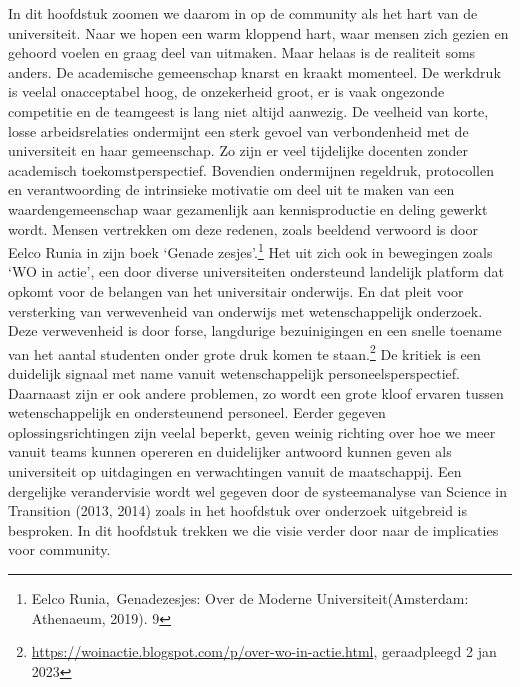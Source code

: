 \documentclass{jote-book}
\begin{document}
	In dit hoofdstuk zoomen we daarom in op de community als het hart van de universiteit. Naar we hopen een warm kloppend hart, waar mensen zich gezien en gehoord voelen en graag deel van uitmaken. Maar helaas is de realiteit soms anders. De academische gemeenschap knarst en kraakt momenteel. De werkdruk is veelal onacceptabel hoog, de onzekerheid groot, er is vaak ongezonde competitie en de teamgeest is lang niet altijd aanwezig. De veelheid van korte, losse arbeidsrelaties ondermijnt een sterk gevoel van verbondenheid met de universiteit en haar gemeenschap. Zo zijn er veel tijdelijke docenten zonder academisch toekomstperspectief. Bovendien ondermijnen regeldruk, protocollen en verantwoording de intrinsieke motivatie om deel uit te maken van een waardengemeenschap waar gezamenlijk aan kennisproductie en deling gewerkt wordt. Mensen vertrekken om deze redenen, zoals beeldend verwoord is door Eelco Runia in zijn boek ‘Genade zesjes'.\footnote{Eelco Runia, Genadezesjes: Over de Moderne Universiteit(Amsterdam: Athenaeum, 2019). 9} Het uit zich ook in bewegingen zoals ‘WO in actie', een door diverse universiteiten ondersteund landelijk platform dat opkomt voor de belangen van het universitair onderwijs. En dat pleit voor versterking van verwevenheid van onderwijs met wetenschappelijk onderzoek. Deze verwevenheid is door forse, langdurige bezuinigingen en een snelle toename van het aantal studenten onder grote druk komen te staan.\footnote{\href{https://woinactie.blogspot.com/p/over-wo-in-actie.html}{https://woinactie.blogspot.com/p/over-wo-in-actie.html}, geraadpleegd 2 jan 2023} De kritiek is een duidelijk signaal met name vanuit wetenschappelijk personeelsperspectief. Daarnaast zijn er ook andere problemen, zo wordt een grote kloof ervaren tussen wetenschappelijk en ondersteunend personeel. Eerder gegeven oplossingsrichtingen zijn veelal beperkt, geven weinig richting over hoe we meer vanuit teams kunnen opereren en duidelijker antwoord kunnen geven als universiteit op uitdagingen en verwachtingen vanuit de maatschappij. Een dergelijke verandervisie wordt wel gegeven door de systeemanalyse van Science in Transition (2013, 2014) zoals in het hoofdstuk over onderzoek uitgebreid is besproken. In dit hoofdstuk trekken we die visie verder door naar de implicaties voor community.
\end{document}
